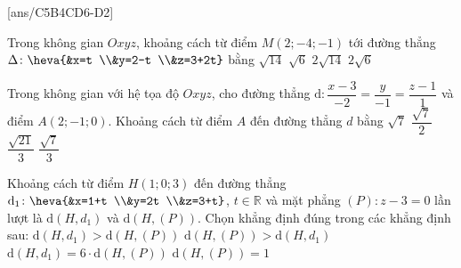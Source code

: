 \TN
{}[ans/C5B4CD6-D2]
\begin{ex}%
	Trong không gian $Oxyz$, khoảng cách từ điểm $M(2;-4;-1)$ tới đường thẳng $\Delta\colon \heva{&x=t \\&y=2-t \\&z=3+2t}$ bằng
\choice
{$\sqrt{14}$}
{$\sqrt{6}$}
{\True $2\sqrt{14}$}
{$2\sqrt{6}$}
\end{ex}
\begin{ex}%
	Trong không gian với hệ tọa độ $Oxyz$, cho đường thẳng $\mathrm{d}\colon\dfrac{x-3}{-2}=\dfrac{y}{-1}=\dfrac{z-1}{1}$ và điểm $A(2;-1;0)$. Khoảng cách từ điểm $A$ đến đường thẳng $d$ bằng
\choice
{$\sqrt{7}$}
{$\dfrac{\sqrt{7}}{2}$}
{\True $\dfrac{\sqrt{21}}{3}$}
{$\dfrac{\sqrt{7}}{3}$}
\end{ex}
\begin{ex}%
	Khoảng cách từ điểm $H(1;0;3)$ đến đường thẳng $\mathrm{d}_1\colon \heva{&x=1+t \\&y=2t \\&z=3+t}$, $t\in \mathbb{R}$ và mặt phẳng $(P)\colon z-3=0$ lần lượt là $\mathrm{d}(H,d_1)$ và $\mathrm{d}(H,(P))$. Chọn khẳng định đúng trong các khẳng định sau:
	\choice
	{$\mathrm{d}(H,d_1)>\mathrm{d}(H,(P))$}
	{$\mathrm{d}(H,(P))>\mathrm{d}(H,d_1)$}
	{\True $\mathrm{d}(H,d_1)=6\cdot \mathrm{d}(H,(P))$}
	{$\mathrm{d}(H,(P))=1$}
\end{ex}

